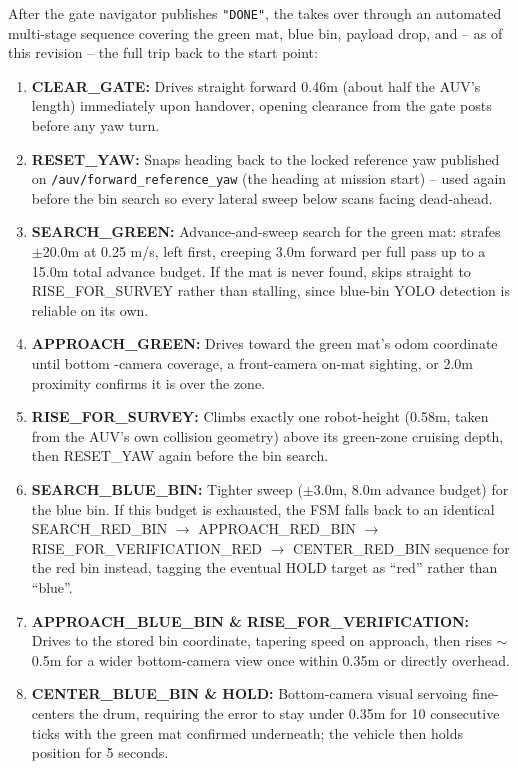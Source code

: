 \documentclass[10.5pt,a4paper]{article}
\newcommand{\hl}[1]{\tikz[baseline=(t.base)]{\node[fill=codeorange,rounded corners=2pt,inner sep=2pt,font=\ttfamily\scriptsize,text=codeorangetxt] (t) {#1};}}
\newcommand{\code}[1]{\texttt{\small\color{accent}#1}}
\begin{document}
After the gate navigator publishes \texttt{"DONE"}, the \hl{green\_navigator\_node} takes
over through an automated multi-stage sequence covering the green mat, blue bin, payload
drop, and -- as of this revision -- the full trip back to the start point:

\begin{enumerate}[leftmargin=1.6em,itemsep=1pt]
  \item \textbf{CLEAR\_GATE:} Drives straight forward 0.46m (about half the AUV's length)
    immediately upon handover, opening clearance from the gate posts before any yaw turn.
  \item \textbf{RESET\_YAW:} Snaps heading back to the locked reference yaw published on
    \code{/auv/forward\_reference\_yaw} (the heading at mission start) -- used again before
    the bin search so every lateral sweep below scans facing dead-ahead.
  \item \textbf{SEARCH\_GREEN:} Advance-and-sweep search for the green mat: strafes
    $\pm$20.0m at 0.25 m/s, left first, creeping 3.0m forward per full pass up to a 15.0m
    total advance budget. If the mat is never found, skips straight to RISE\_FOR\_SURVEY
    rather than stalling, since blue-bin YOLO detection is reliable on its own.
  \item \textbf{APPROACH\_GREEN:} Drives toward the green mat's odom coordinate until bottom
    -camera coverage, a front-camera on-mat sighting, or 2.0m proximity confirms it is over
    the zone.
  \item \textbf{RISE\_FOR\_SURVEY:} Climbs exactly one robot-height (0.58m, taken from the
    AUV's own collision geometry) above its green-zone cruising depth, then RESET\_YAW again
    before the bin search.
  \item \textbf{SEARCH\_BLUE\_BIN:} Tighter sweep ($\pm$3.0m, 8.0m advance budget) for the
    blue bin. If this budget is exhausted, the FSM falls back to an identical
    SEARCH\_RED\_BIN $\to$ APPROACH\_RED\_BIN $\to$ RISE\_FOR\_VERIFICATION\_RED $\to$
    CENTER\_RED\_BIN sequence for the red bin instead, tagging the eventual HOLD target as
    ``red'' rather than ``blue''.
  \item \textbf{APPROACH\_BLUE\_BIN \& RISE\_FOR\_VERIFICATION:} Drives to the stored bin
    coordinate, tapering speed on approach, then rises $\sim$0.5m for a wider bottom-camera
    view once within 0.35m or directly overhead.
  \item \textbf{CENTER\_BLUE\_BIN \& HOLD:} Bottom-camera visual servoing fine-centers the
    drum, requiring the error to stay under 0.35m for 10 consecutive ticks with the green mat
    confirmed underneath; the vehicle then holds position for 5 seconds.
\end{enumerate}
\end{document}
